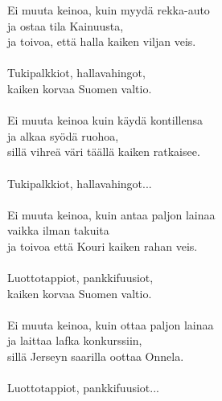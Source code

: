 
            Ei muuta keinoa, kuin myydä rekka-auto \\
            ja ostaa tila Kainuusta, \\
            ja toivoa, että halla kaiken viljan veis. \\
\hspace{10mm} \\
            Tukipalkkiot, hallavahingot, \\
            kaiken korvaa Suomen valtio. \\
\hspace{10mm} \\
            Ei muuta keinoa kuin käydä kontillensa \\
            ja alkaa syödä ruohoa, \\
            sillä vihreä väri täällä kaiken ratkaisee. \\
\hspace{10mm} \\
            Tukipalkkiot, hallavahingot... \\
\hspace{10mm} \\
            Ei muuta keinoa, kuin antaa paljon lainaa \\
            vaikka ilman takuita \\
            ja toivoa että Kouri kaiken rahan veis. \\
\hspace{10mm} \\
            Luottotappiot, pankkifuusiot, \\
            kaiken korvaa Suomen valtio. \\
\hspace{10mm} \\
            Ei muuta keinoa, kuin ottaa paljon lainaa \\
            ja laittaa lafka konkurssiin, \\
            sillä Jerseyn saarilla oottaa Onnela. \\
\hspace{10mm} \\
            Luottotappiot, pankkifuusiot... \\
